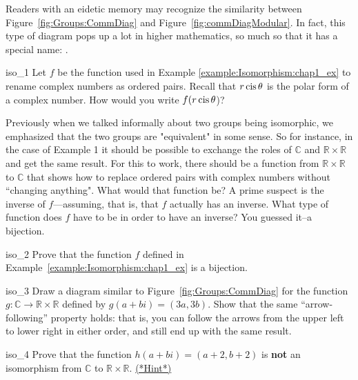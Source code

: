 \begin{rem}
Readers with an eidetic memory may recognize the similarity between Figure~\ref{fig:Groups:CommDiag} and Figure~\ref{fig:commDiagModular}. In fact, this type of diagram pops up a lot in higher mathematics, so much so that it has a special name: .
\end{rem}

\begin{exercise}{iso_1}
Let $f$ be  the function used in Example \ref{example:Isomorphism:chap1_ex} to rename complex numbers as ordered pairs. Recall that $r \operatorname{cis} \theta$ is the polar form of a complex number. How would you write $f(r \operatorname{cis} \theta$)?
\end{exercise}

Previously when we talked informally about two groups being isomorphic, we emphasized that  the two groups are "equivalent"  in some sense.  So for instance, in the case of Example 1 it should be possible to exchange the roles of  ${\mathbb C}$ and ${\mathbb R} \times {\mathbb R}$ and get the same result.  For this to work, there should  be a function from ${\mathbb R} \times {\mathbb R}$ to ${\mathbb C}$  that shows how to replace ordered pairs with complex numbers without ``changing anything".  What would that function be?  A prime suspect is the inverse of $f$---assuming, that is, that $f$ actually has an inverse.  What type of function does $f$ have to be in order to have an inverse?  You guessed it--a bijection.

\begin{exercise}{iso_2}
Prove that the function $f$ defined in Example~\ref{example:Isomorphism:chap1_ex}  is a bijection.
\end{exercise}

\begin{exercise}{iso_3} 
Draw a diagram similar to Figure~\ref{fig:Groups:CommDiag}  for the function $g: {\mathbb C} \rightarrow {\mathbb R} \times {\mathbb R}$ defined by $g(a + bi) = (3a, 3b)$. Show that the same ``arrow-following'' property holds: that is, you can follow the arrows from the upper left to lower right in either order, and still end up with the same result.
\end{exercise} 

\begin{exercise}{iso_4}
Prove that the function $h(a + bi) = (a+2, b+2)$ is {\bf not} an isomorphism from ${\mathbb C}$ to  ${\mathbb R} \times {\mathbb R}$.
\hyperref[sec:Isomorphism:hints]{(*Hint*)}
 \end{exercise}


